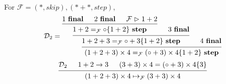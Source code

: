 \documentclass{article}
\newcommand{\steps}{\mathrel{\mathop{\vartriangleright}}}
\newcommand{\final}{~\mathbf{final}}
\newcommand{\istep}{~\mathbf{step}}
\begin{document}
For \(\mathcal{F} = (\ast, skip), (\ast + \ast, step)\),
\[
  \mathcal{D}_2 = \begin{prooftree}
    \hypo{1 \final}
    \hypo{2 \final}
    \hypo{\mathcal{F} \steps 1 + 2}
    \infer3{1 + 2 =_\mathcal{F} \circ \{ 1 + 2 \} \istep}
    \hypo{3 \final}
    \infer2{1 + 2 + 3 =_\mathcal{F} \circ + 3 \{ 1 + 2 \} \istep}
    \hypo{4 \final}
    \infer2{(1 + 2 + 3) \times 4 =_\mathcal{F} (\circ + 3) \times 4 \{ 1 + 2 \} \istep}
  \end{prooftree}
\]
\[
  \begin{prooftree}
    \hypo{\mathcal{D}_2}
    \hypo{1 + 2 \to 3}
    \hypo{(3 + 3) \times 4 = (\circ + 3) \times 4 \{ 3 \}}
    \infer3{(1 + 2 + 3) \times 4 \mapsto_\mathcal{F} (3 + 3) \times 4}
  \end{prooftree}
\]
\end{document}
